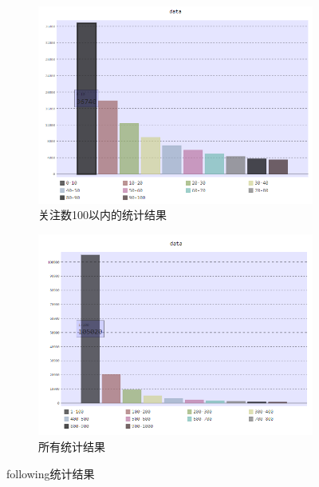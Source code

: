 \documentclass[bachelor,adobefonts]{jnuthesis}
\begin{document}
\begin{figure}[h!]
  \centering
  \begin{subfigure}[b]{0.49\linewidth}
    \includegraphics[width=\linewidth]{Wtongji-1.png}
    \caption{关注数100以内的统计结果}
  \end{subfigure}
  \begin{subfigure}[b]{0.49\linewidth}
    \includegraphics[width=\linewidth]{Wtongji-2.png}
    \caption{所有统计结果}
  \end{subfigure}
  \caption{following统计结果}
\end{figure}
\end{document}
